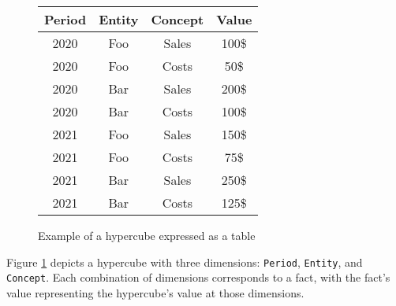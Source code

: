 \begin{figure}[H]
    \centering
    \begin{tabular}{|c|c|c|c|}
        \hline
        Period & Entity & Concept & Value \\
        \hline
        2020 & Foo & Sales & 100\$ \\
        \hline
        2020 & Foo & Costs & 50\$ \\
        \hline
        2020 & Bar & Sales & 200\$ \\
        \hline
        2020 & Bar & Costs & 100\$ \\
        \hline
        2021 & Foo & Sales & 150\$ \\
        \hline
        2021 & Foo & Costs & 75\$ \\
        \hline
        2021 & Bar & Sales & 250\$ \\
        \hline
        2021 & Bar & Costs & 125\$ \\
        \hline
    \end{tabular}
    \caption{Example of a hypercube expressed as a table}
    \label{fig:example_hypercube}
\end{figure}

Figure \ref{fig:example_hypercube} depicts a hypercube with three dimensions: \texttt{Period}, \texttt{Entity}, and \texttt{Concept}.
Each combination of dimensions corresponds to a fact, with the fact's value representing the hypercube's value at those dimensions.





